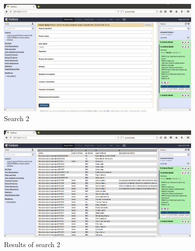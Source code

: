 \documentclass[12pt]{article}
\begin{document}
\begin{figure}[h]
	\includegraphics[width=0.9\textwidth]{figures/2a}
	\caption{Search 2}
	\label{fig:example_2a}
\end{figure}
\begin{figure}[h]
	\includegraphics[width=0.9\textwidth]{figures/2b}
	\caption{Results of search 2}
	\label{fig:example_2b}
\end{figure}
\end{document}
